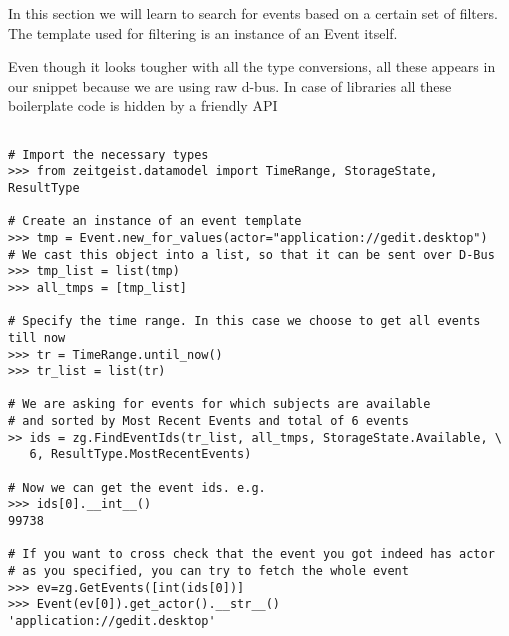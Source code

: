 In this section we will learn to search for events based on a certain set of filters.
The template used for filtering is an instance of an Event itself.

Even though it looks tougher with all the type conversions, all these appears in 
our snippet because we are using raw d-bus. In case of libraries all these 
boilerplate code is hidden by a friendly API

\begin{center}
\begin{verbatim}

# Import the necessary types
>>> from zeitgeist.datamodel import TimeRange, StorageState, ResultType

# Create an instance of an event template
>>> tmp = Event.new_for_values(actor="application://gedit.desktop")
# We cast this object into a list, so that it can be sent over D-Bus
>>> tmp_list = list(tmp)
>>> all_tmps = [tmp_list]

# Specify the time range. In this case we choose to get all events till now
>>> tr = TimeRange.until_now()
>>> tr_list = list(tr)

# We are asking for events for which subjects are available 
# and sorted by Most Recent Events and total of 6 events
>> ids = zg.FindEventIds(tr_list, all_tmps, StorageState.Available, \
   6, ResultType.MostRecentEvents)

# Now we can get the event ids. e.g.
>>> ids[0].__int__()
99738

# If you want to cross check that the event you got indeed has actor 
# as you specified, you can try to fetch the whole event
>>> ev=zg.GetEvents([int(ids[0])]
>>> Event(ev[0]).get_actor().__str__()
'application://gedit.desktop'



\end{verbatim}
\end{center}